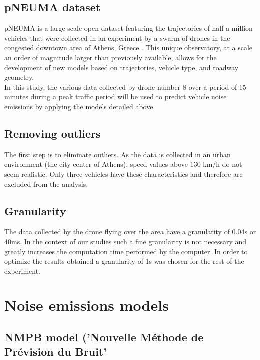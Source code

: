 \documentclass{article}
\begin{document}
\subsection{pNEUMA dataset}

\noindent pNEUMA is a large-scale open dataset featuring the trajectories of half a million vehicles that were collected in an experiment by a {\color{red} swarm} of drones in the congested downtown area of Athens, Greece \cite{Pneuma_data_set}. This unique observatory, at a scale an order of magnitude larger than previously available, allows for the development of new models based on trajectories, vehicle type, and roadway geometry. \\
\noindent In this study, the various data collected by drone number 8 over a period of 15 minutes during a peak traffic period will be used to predict vehicle noise emissions by applying the models detailed above.

\subsection{Removing outliers}

The first step is to eliminate outliers. As the data is collected in an urban environment (the city center of Athens), speed values above 130 km/h do not seem realistic. Only three vehicles have these characteristics {\color{red} and therefore are excluded from the analysis.}

\subsection{Granularity}

The data collected by the drone flying over the area have a granularity of 0.04s or 40ms. In the context of our studies such a fine granularity is not necessary and greatly increases the computation time performed by the computer. In order to optimize the results obtained a granularity of 1s was chosen for the rest of the experiment.

\section{Noise emissions models}

\subsection{NMPB model ('Nouvelle Méthode de Prévision du Bruit'}
\end{document}
